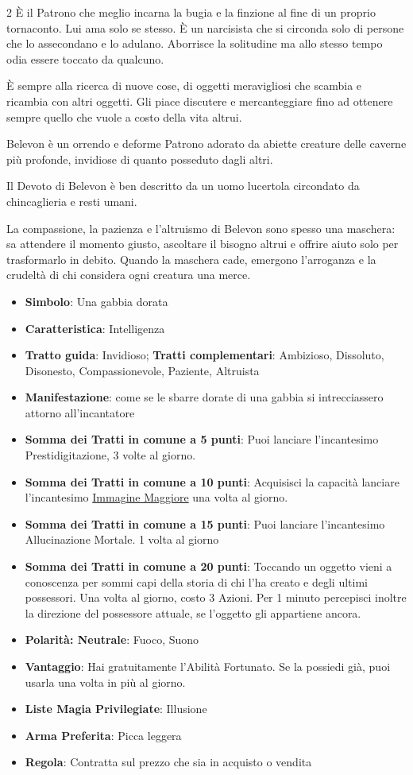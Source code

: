 \begin{multicols}{2}
È il Patrono che meglio incarna la bugia e la finzione al fine di un proprio tornaconto. Lui ama solo se stesso. È un narcisista che si circonda solo di persone che lo assecondano e lo adulano. Aborrisce la solitudine ma allo stesso tempo odia essere toccato da qualcuno.

È sempre alla ricerca di nuove cose, di oggetti meravigliosi che scambia e ricambia con altri oggetti. Gli piace discutere e mercanteggiare fino ad ottenere sempre quello che vuole a costo della vita altrui.

Belevon è un orrendo e deforme Patrono adorato da abiette creature delle caverne più profonde, invidiose di quanto posseduto dagli altri.

Il Devoto di Belevon è ben descritto da un uomo lucertola circondato da chincaglieria e resti umani.

La compassione, la pazienza e l'altruismo di Belevon sono spesso una maschera: sa attendere il momento giusto, ascoltare il bisogno altrui e offrire aiuto solo per trasformarlo in debito. Quando la maschera cade, emergono l'arroganza e la crudeltà di chi considera ogni creatura una merce.

\begin{itemize}[leftmargin=*] \setlength{\itemsep}{0pt}
\item \textbf{Simbolo}: Una gabbia dorata
\item \textbf{Caratteristica}: Intelligenza
\item \textbf{Tratto guida}: Invidioso; \textbf{Tratti complementari}: Ambizioso, Dissoluto, Disonesto, Compassionevole, Paziente, Altruista
\item \textbf{Manifestazione}: come se le sbarre dorate di una gabbia si intrecciassero attorno all'incantatore
\item \textbf{Somma dei Tratti in comune a 5 punti}: Puoi lanciare l'incantesimo Prestidigitazione, 3 volte al giorno.
\item \textbf{Somma dei Tratti in comune a 10 punti}: Acquisisci la capacità lanciare l'incantesimo \hyperlink{Immagine Maggiore}{Immagine Maggiore} una volta al giorno.
\item \textbf{Somma dei Tratti in comune a 15 punti}: Puoi lanciare l'incantesimo Allucinazione Mortale. 1 volta al giorno
\item \textbf{Somma dei Tratti in comune a 20 punti}: Toccando un oggetto vieni a conoscenza per sommi capi della storia di chi l'ha creato e degli ultimi possessori. Una volta al giorno, costo 3 Azioni. Per 1 minuto percepisci inoltre la direzione del possessore attuale, se l'oggetto gli appartiene ancora.
\item \textbf{Polarità: Neutrale}: Fuoco, Suono
\item \textbf{Vantaggio}: Hai gratuitamente l'Abilità Fortunato. Se la possiedi già, puoi usarla una volta in più al giorno.
\item \textbf{Liste Magia Privilegiate}: Illusione
\item \textbf{Arma Preferita}: Picca leggera
\item \textbf{Regola}: Contratta sul prezzo che sia in acquisto o vendita
\end{itemize}


\end{multicols}
